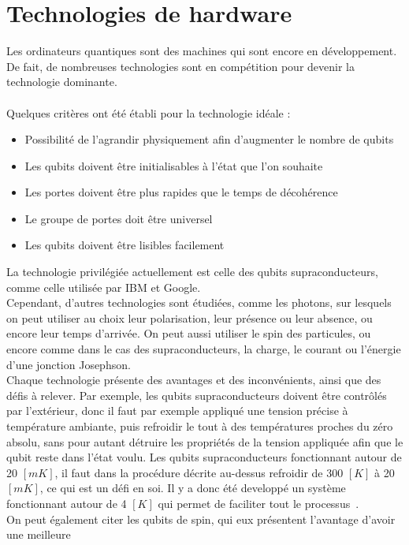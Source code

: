 \chapter{Technologies de hardware}\label{ch:technologies-de-hardware}

Les ordinateurs quantiques sont des machines qui sont encore en développement.
De fait, de nombreuses technologies sont en compétition pour devenir la technologie dominante.\\ \\
Quelques critères ont été établi pour la technologie idéale :
\begin{itemize}
    \item Possibilité de l'agrandir physiquement afin d'augmenter le nombre de qubits
    \item Les qubits doivent être initialisables à l'état que l'on souhaite
    \item Les portes doivent être plus rapides que le temps de décohérence
    \item Le groupe de portes doit être universel
    \item Les qubits doivent être lisibles facilement
\end{itemize}
La technologie privilégiée actuellement est celle des qubits supraconducteurs,
comme celle utilisée par IBM et Google.\\
Cependant, d'autres technologies sont étudiées, comme les photons, sur lesquels on peut
utiliser au choix leur polarisation, leur présence ou leur absence, ou encore leur temps d'arrivée.
On peut aussi utiliser le spin des particules, ou encore comme dans le cas des supraconducteurs,
la charge, le courant ou l'énergie d'une jonction Josephson.\\
Chaque technologie présente des avantages et des inconvénients, ainsi que des défis à relever.
Par exemple, les qubits supraconducteurs doivent être contrôlés par l'extérieur, donc il faut par
exemple appliqué une tension précise à température ambiante, puis refroidir le tout à des températures
proches du zéro absolu, sans pour autant détruire les propriétés de la tension appliquée afin que le
qubit reste dans l'état voulu.
Les qubits supraconducteurs fonctionnant autour de 20 $[mK]$, il faut dans la procédure décrite au-dessus
refroidir de 300 $[K]$ à 20 $[mK]$, ce qui est un défi en soi.
Il y a donc été developpé un système fonctionnant autour de 4 $[K]$ qui permet de faciliter tout le
processus~\cite{cryo-cmos}.\\
On peut également citer les qubits de spin, qui eux présentent l'avantage d'avoir une meilleure
